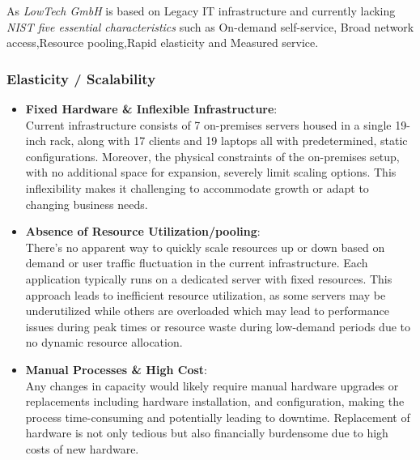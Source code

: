 \documentclass{llncs}
\begin{document}
As \textit{LowTech GmbH} is based on Legacy IT infrastructure and currently lacking \textit{NIST five
essential characteristics} such as On-demand self-service, Broad network access,Resource pooling,Rapid elasticity and Measured service.

\subsubsection*{Elasticity / Scalability}

\begin{itemize}
  \item \textbf{Fixed Hardware \& Inflexible Infrastructure}:
        \\
        Current infrastructure consists of 7 on-premises servers housed in a single 19-inch rack, 
        along with 17 clients and 19 laptops all with predetermined, static configurations. 
        Moreover, the physical constraints of the on-premises setup, with no additional space for expansion, severely limit scaling options. 
        This inflexibility makes it challenging to accommodate growth or adapt to changing business needs.
        \\
  \item \textbf{Absence of Resource Utilization/pooling}:
        \\ 
        There's no apparent way to quickly scale resources up or down based on demand or user traffic fluctuation in the current infrastructure. 
        Each application typically runs on a dedicated server with fixed resources. 
        This approach leads to inefficient resource utilization, as some servers may be underutilized while others are overloaded which may lead to performance issues during peak times or resource waste during low-demand periods due to no dynamic resource allocation.
        \\
  \item \textbf{Manual Processes \& High Cost}:
        \\ 
        Any changes in capacity would likely require manual hardware upgrades or replacements including hardware installation,
        and configuration, making the process time-consuming and potentially leading to downtime.
        Replacement of hardware is not only tedious but also financially burdensome due to high costs of new hardware.
        
\end{itemize}
\end{document}
